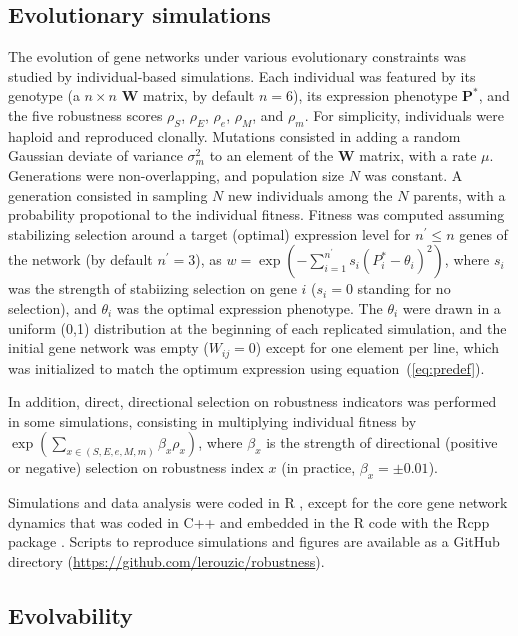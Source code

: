 \documentclass[10pt,a4paper]{article}
\newcommand{\stability}{{\rho_S}}
\newcommand{\earlyenv}{{\rho_E}}
\newcommand{\lateenv}{{\rho_e}}
\newcommand{\earlymut}{{\rho_M}}
\newcommand{\latemut}{{\rho_m}}
\begin{document}
\subsection{Evolutionary simulations}

The evolution of gene networks under various evolutionary constraints was studied by individual-based simulations. Each individual was featured by its genotype (a $n \times n$ $\bm W$ matrix, by default $n=6$), its expression phenotype $\bm P^*$, and the five robustness scores $\stability$, $\earlyenv$, $\lateenv$, $\earlymut$, and $\latemut$. For simplicity, individuals were haploid and reproduced clonally. Mutations consisted in adding a random Gaussian deviate of variance $\sigma_m^2$ to an element of the $\bm W$ matrix, with a rate $\mu$. Generations were non-overlapping, and population size $N$ was constant. A generation consisted in sampling $N$ new individuals among the $N$ parents, with a probability propotional to the individual fitness. Fitness was computed assuming stabilizing selection around a target (optimal) expression level for $n^\prime \leq n$ genes of the network (by default $n^\prime=3$), as $w = \exp(- \sum_{i=1}^{n^\prime} s_i (P_i^* - \theta_i)^2 )$, where $s_i$ was the strength of stabiizing selection on gene $i$ ($s_i = 0$ standing for no selection), and $\theta_i$ was the optimal expression phenotype. The $\theta_i$ were drawn in a uniform (0,1) distribution at the beginning of each replicated simulation, and the initial gene network was empty ($W_{ij} = 0$) except for one element per line, which was initialized to match the optimum expression using equation~(\ref{eq:predef}). 

In addition, direct, directional selection on robustness indicators was performed in some simulations, consisting in multiplying individual fitness by $\exp ( \sum_{x \in (S, E, e, M, m)} \beta_x \rho _x )$, where $\beta_x$ is the strength of directional (positive or negative) selection on robustness index $x$ (in practice, $\beta_x= \pm 0.01$). 

Simulations and data analysis were coded in R \citep{R20}, except for the core gene network dynamics that was coded in C++ and embedded in the R code with the Rcpp package \citep{EF11}. Scripts to reproduce simulations and figures are available as a GitHub directory (\url{https://github.com/lerouzic/robustness}). 

\subsection{Evolvability}
\end{document}
